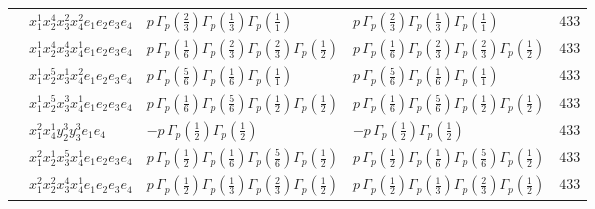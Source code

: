 \documentclass[11pt]{article}
\begin{document}
\begin{table}[ht]
{\begin{tabular}{@{}lllll@{}}
 & $x_{1}^{1} x_{2}^{4} x_{3}^{2} x_{4}^{2}  e_{1} e_{2} e_{3} e_{4}$ & $p \, \Gamma_p \left( \frac{2}{3} \right) \Gamma_p \left( \frac{1}{3} \right) \Gamma_p \left( \frac{1}{1} \right)$ & $p \, \Gamma_p \left( \frac{2}{3} \right) \Gamma_p \left( \frac{1}{3} \right) \Gamma_p \left( \frac{1}{1} \right)$ & $433$ \\
 & $x_{1}^{1} x_{2}^{4} x_{3}^{4} x_{4}^{1}  e_{1} e_{2} e_{3} e_{4}$ & $p \, \Gamma_p \left( \frac{1}{6} \right) \Gamma_p \left( \frac{2}{3} \right) \Gamma_p \left( \frac{2}{3} \right) \Gamma_p \left( \frac{1}{2} \right)$ & $p \, \Gamma_p \left( \frac{1}{6} \right) \Gamma_p \left( \frac{2}{3} \right) \Gamma_p \left( \frac{2}{3} \right) \Gamma_p \left( \frac{1}{2} \right)$ & $433$ \\
 & $x_{1}^{1} x_{2}^{5} x_{3}^{1} x_{4}^{2}  e_{1} e_{2} e_{3} e_{4}$ & $p \, \Gamma_p \left( \frac{5}{6} \right) \Gamma_p \left( \frac{1}{6} \right) \Gamma_p \left( \frac{1}{1} \right)$ & $p \, \Gamma_p \left( \frac{5}{6} \right) \Gamma_p \left( \frac{1}{6} \right) \Gamma_p \left( \frac{1}{1} \right)$ & $433$ \\
 & $x_{1}^{1} x_{2}^{5} x_{3}^{3} x_{4}^{1}  e_{1} e_{2} e_{3} e_{4}$ & $p \, \Gamma_p \left( \frac{1}{6} \right) \Gamma_p \left( \frac{5}{6} \right) \Gamma_p \left( \frac{1}{2} \right) \Gamma_p \left( \frac{1}{2} \right)$ & $p \, \Gamma_p \left( \frac{1}{6} \right) \Gamma_p \left( \frac{5}{6} \right) \Gamma_p \left( \frac{1}{2} \right) \Gamma_p \left( \frac{1}{2} \right)$ & $433$ \\
 & $x_{1}^{2} x_{4}^{1} y_{2}^{3} y_{3}^{3} e_{1} e_{4}$ & $- p \, \Gamma_p \left( \frac{1}{2} \right) \Gamma_p \left( \frac{1}{2} \right)$ & $- p \, \Gamma_p \left( \frac{1}{2} \right) \Gamma_p \left( \frac{1}{2} \right)$ & $433$ \\
 & $x_{1}^{2} x_{2}^{1} x_{3}^{5} x_{4}^{1}  e_{1} e_{2} e_{3} e_{4}$ & $p \, \Gamma_p \left( \frac{1}{2} \right) \Gamma_p \left( \frac{1}{6} \right) \Gamma_p \left( \frac{5}{6} \right) \Gamma_p \left( \frac{1}{2} \right)$ & $p \, \Gamma_p \left( \frac{1}{2} \right) \Gamma_p \left( \frac{1}{6} \right) \Gamma_p \left( \frac{5}{6} \right) \Gamma_p \left( \frac{1}{2} \right)$ & $433$ \\
 & $x_{1}^{2} x_{2}^{2} x_{3}^{4} x_{4}^{1}  e_{1} e_{2} e_{3} e_{4}$ & $p \, \Gamma_p \left( \frac{1}{2} \right) \Gamma_p \left( \frac{1}{3} \right) \Gamma_p \left( \frac{2}{3} \right) \Gamma_p \left( \frac{1}{2} \right)$ & $p \, \Gamma_p \left( \frac{1}{2} \right) \Gamma_p \left( \frac{1}{3} \right) \Gamma_p \left( \frac{2}{3} \right) \Gamma_p \left( \frac{1}{2} \right)$ & $433$ \\

\end{tabular}}
\end{table}
\end{document}
